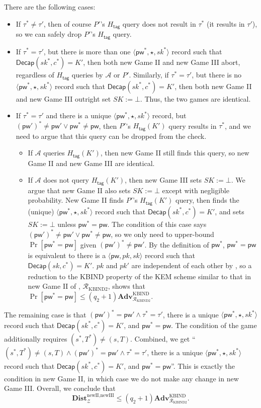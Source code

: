 \documentclass{article}
\theoremstyle{plain}
\theoremstyle{definition}
\theoremstyle{remark}
\newcommand{\adv}{\mathcal{A}}
\newcommand{\env}{\mathcal{Z}}
\newcommand{\red}{\mathcal{R}}
\newcommand{\Adv}{\mathbf{Adv}}
\newcommand{\Dist}{\mathbf{Dist}}
\newcommand{\Decap}{\mathsf{Decap}}
\newcommand{\Htag}{H_\mathsf{tag}}
\newcommand{\pw}{\mathsf{pw}}
\begin{document}
There are the following cases:
\begin{itemize}
  \item If $\tau^* \neq \tau'$, then of course $P'$'s $\Htag$ query does not result in $\tau^*$ (it results in $\tau'$), so we can safely drop $P'$'s $\Htag$ query.
  \item If $\tau^* = \tau'$, but there is more than one $\langle\pw^*,\star,sk^*\rangle$ record such that $\Decap(sk^*,c^*) = K'$, then both new Game II and new Game III abort, regardless of $\Htag$ queries by $\adv$ or $P'$. Similarly, if $\tau^* = \tau'$, but there is no $\langle\pw^*,\star,sk^*\rangle$ record such that $\Decap(sk^*,c^*) = K'$, then both new Game II and new Game III outright set $SK := \bot$. Thus, the two games are identical.
  \item If $\tau^* = \tau'$ and there is a unique $\langle\pw^*,\star,sk^*\rangle$ record, but $(\pw')^* \neq \pw' \lor \pw^* \neq \pw$, then $P'$'s $\Htag(K')$ query results in $\tau^*$, and we need to argue that this query can be dropped from the check.
      \begin{itemize}
        \item If $\adv$ queries $\Htag(K')$, then new Game II still finds this query, so new Game II and new Game III are identical.
        \item If $\adv$ does not query $\Htag(K')$, then new Game III sets $SK := \bot$. We argue that new Game II also sets $SK := \bot$ except with negligible probability. New Game II finds $P'$'s $\Htag(K')$ query, then finds the (unique) $\langle\pw^*,\star,sk^*\rangle$ record such that $\Decap(sk^*,c^*) = K'$, and sets $SK := \bot$ unless $\pw^* = \pw$. The condition of this case says $(\pw')^* \neq \pw' \lor \pw^* \neq \pw$, so we only need to upper-bound $\Pr[\pw^* = \pw]$ given $(\pw')^* \neq \pw'$. By the definition of $\pw^*$, $\pw^* = \pw$ is equivalent to there is a $\langle\pw,pk,sk\rangle$ record such that $\Decap(sk,c^*) = K'$. $pk$ and $pk'$ are independent of each other by , so a reduction to the KBIND property of the KEM scheme similar to that in new Game II of , $\red_\text{KBIND2}$, shows that $\Pr[\pw^* = \pw] \leq (q_2+1)\Adv_{\red_\text{KBIND2}}^\text{KBIND}$.
      \end{itemize}
\end{itemize}

The remaining case is that $(\pw')^* = \pw' \land \tau^* = \tau'$, there is a unique $\langle\pw^*,\star,sk^*\rangle$ record such that $\Decap(sk^*,c^*) = K'$, and $\pw^* = \pw$. The condition of the game additionally requires $(s^*,T^*) \neq (s,T)$. Combined, we get ``$(s^*,T^*) \neq (s,T) \land (\pw')^* = \pw' \land \tau^* = \tau'$, there is a unique $\langle\pw^*,\star,sk^*\rangle$ record such that $\Decap(sk^*,c^*) = K'$, and $\pw^* = \pw$''. This is exactly the condition in new Game II, in which case we do not make any change in new Game III. Overall, we conclude that
\[
\Dist_\env^{\text{newII},\text{newIII}} \leq (q_2+1)\Adv_{\red_\text{KBIND2}}^\text{KBIND}.
\]
\end{document}
